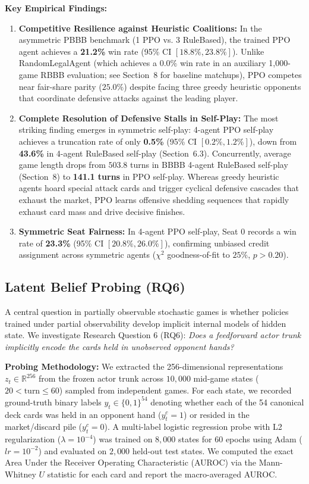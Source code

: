 \documentclass[11pt]{article}
\begin{document}
\noindent\textbf{Key Empirical Findings:}
\begin{enumerate}
  \item \textbf{Competitive Resilience against Heuristic Coalitions:} In the asymmetric PBBB benchmark (1 PPO vs. 3 RuleBased), the trained PPO agent achieves a \textbf{21.2\%} win rate (95\% CI $[18.8\%, 23.8\%]$). Unlike RandomLegalAgent (which achieves a $0.0\%$ win rate in an auxiliary 1,000-game RBBB evaluation; see Section~8 for baseline matchups), PPO competes near fair-share parity ($25.0\%$) despite facing three greedy heuristic opponents that coordinate defensive attacks against the leading player.
  \item \textbf{Complete Resolution of Defensive Stalls in Self-Play:} The most striking finding emerges in symmetric self-play: 4-agent PPO self-play achieves a truncation rate of only \textbf{0.5\%} (95\% CI $[0.2\%, 1.2\%]$), down from \textbf{43.6\%} in 4-agent RuleBased self-play (Section~6.3). Concurrently, average game length drops from $503.8$ turns in BBBB 4-agent RuleBased self-play (Section~8) to \textbf{141.1 turns} in PPO self-play. Whereas greedy heuristic agents hoard special attack cards and trigger cyclical defensive cascades that exhaust the market, PPO learns offensive shedding sequences that rapidly exhaust card mass and drive decisive finishes.
  \item \textbf{Symmetric Seat Fairness:} In 4-agent PPO self-play, Seat 0 records a win rate of \textbf{23.3\%} (95\% CI $[20.8\%, 26.0\%]$), confirming unbiased credit assignment across symmetric agents ($\chi^2$ goodness-of-fit to $25\%$, $p > 0.20$).
\end{enumerate}

\subsection{Latent Belief Probing (RQ6)}
A central question in partially observable stochastic games is whether policies trained under partial observability develop implicit internal models of hidden state. We investigate Research Question 6 (RQ6): \textit{Does a feedforward actor trunk implicitly encode the cards held in unobserved opponent hands?}

\noindent\textbf{Probing Methodology:} We extracted the 256-dimensional representations $z_t \in \mathbb{R}^{256}$ from the frozen actor trunk across $10{,}000$ mid-game states ($20 < \text{turn} \le 60$) sampled from independent games. For each state, we recorded ground-truth binary labels $y_t \in \{0, 1\}^{54}$ denoting whether each of the 54 canonical deck cards was held in an opponent hand ($y_t^c = 1$) or resided in the market/discard pile ($y_t^c = 0$). A multi-label logistic regression probe with L2 regularization ($\lambda = 10^{-4}$) was trained on $8{,}000$ states for 60 epochs using Adam ($lr = 10^{-2}$) and evaluated on $2{,}000$ held-out test states. We computed the exact Area Under the Receiver Operating Characteristic (AUROC) via the Mann-Whitney $U$ statistic for each card and report the macro-averaged AUROC.
\end{document}
